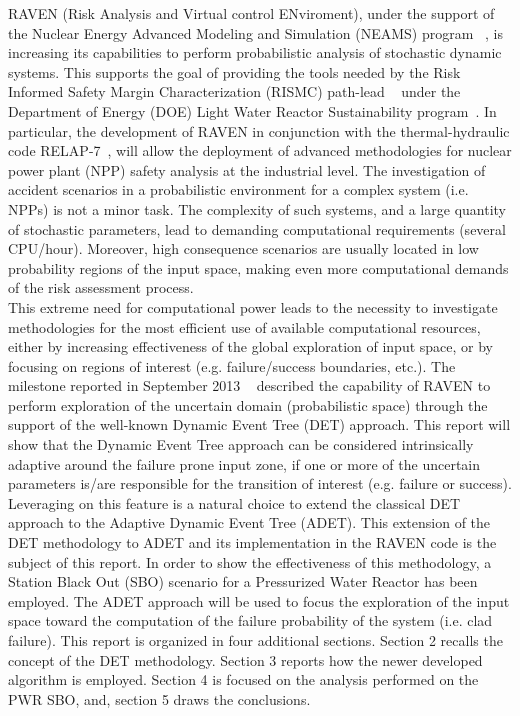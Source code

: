 \label{sec:introduction}
RAVEN (Risk Analysis and Virtual control ENviroment), under the support of the Nuclear Energy Advanced Modeling and Simulation (NEAMS) program ~\cite{neams}, is increasing its capabilities to perform probabilistic analysis of stochastic dynamic systems. This supports the goal of providing the tools needed by the Risk Informed Safety Margin Characterization (RISMC) path-lead ~\cite{mandelliANS_RISMC} under the Department of Energy (DOE) Light Water Reactor Sustainability program~\cite{lwrs}. In particular, the development of RAVEN in conjunction with the thermal-hydraulic code RELAP-7~\cite{relap7FY12}, will allow the deployment of advanced methodologies for nuclear power plant (NPP) safety analysis at the industrial level. The investigation of accident scenarios in a probabilistic environment for a complex system (i.e. NPPs) is not a minor task. The complexity of such systems, and a large quantity of stochastic parameters, lead to demanding computational requirements (several CPU/hour). Moreover, high consequence scenarios are usually located in low probability regions of the input space, making even more computational demands of the risk assessment process.
\\ This extreme need for computational power leads to the necessity to investigate methodologies for the most efficient use of available computational resources, either by increasing effectiveness of the global exploration of input space, or by focusing on regions of interest (e.g. failure/success boundaries, etc.). The milestone reported in September 2013 ~\cite{DETmilestone2013} described the capability of RAVEN to perform exploration of the uncertain domain (probabilistic space) through the support of the well-known Dynamic Event Tree (DET) approach. This report will show that the Dynamic Event Tree approach can be considered intrinsically adaptive around the failure prone input zone, if one or more of the uncertain parameters is/are responsible for the transition of interest (e.g. failure or success). Leveraging on this feature is a natural choice to extend the classical DET approach to the Adaptive Dynamic Event Tree (ADET). This extension of the DET methodology to ADET and its implementation in the RAVEN code is the subject of this report. In order to show the effectiveness of this methodology, a Station Black Out (SBO) scenario for a Pressurized Water Reactor has been employed. The ADET approach will be used to focus the exploration of the input space toward the computation of the failure probability of the system (i.e. clad failure). This report is organized in four additional sections. Section 2 recalls the concept of the DET methodology. Section 3 reports how the newer developed algorithm is employed. Section 4 is focused on the analysis performed on the PWR SBO, and, section 5 draws the conclusions.



